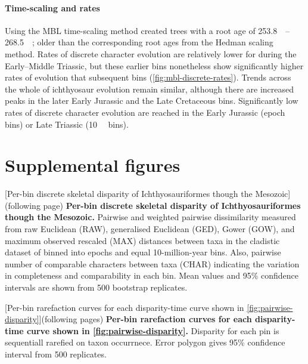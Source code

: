 \documentclass[british,a4paper]{article}
\makeatletter
\renewcommand\listoffigures{%
	    \@starttoc{lof}%
    }
\newcommand\pcref[1]{(\cref{#1})}
\makeatother
\begin{document}
\paragraph{Time-scaling and rates}\label{par:mbl-scaling-rates}

Using the MBL time-scaling method created trees with a root age of
\SIrange{253.8}{268.5}{\mega\annum}; older than the corresponding root ages from
the Hedman scaling method. Rates of discrete character evolution are relatively
lower for during the Early–Middle Triassic, but these earlier bins nonetheless
show significantly higher rates of evolution that subsequent bins
\pcref{fig:mbl-discrete-rates}. Trends across the whole of ichthyosaur evolution
remain similar, although there are increased peaks in the later Early Jurassic
and the Late Cretaceous bins. Significantly low rates of discrete character
evolution are reached in the Early Jurassic (epoch bins) or Late Triassic
(\SI{10}{\mega\annum} bins).



\section{Supplemental figures}\label{sec:supplemental-figures}

\listoffigures

[Per-bin discrete skeletal disparity of Ichthyosauriformes though
    the Mesozoic]{(following page) \textbf{Per-bin discrete skeletal disparity
    of Ichthyosauriformes though the Mesozoic.} Pairwise and weighted
    pairwise dissimilarity measured from raw Euclidean (RAW), generalised
    Euclidean (GED), Gower (GOW), and maximum observed rescaled (MAX)
    distances between taxa in the cladistic dataset of \textcite{Moon2018JSP}
    binned into epochs and equal 10-million-year bins. Also, pairwise number
    of comparable characters between taxa (CHAR) indicating the variation in
    completeness and comparability in each bin. Mean values and 95\%
    confidence intervals are shown from 500 bootstrap
    replicates.\label{fig:pairwise-disparity}}


[Per-bin rarefaction curves for each disparity-time curve
    shown in \cref{fig:pairwise-disparity}]{(following pages) \textbf{Per-bin
    rarefaction curves for each disparity-time curve shown in
    \cref{fig:pairwise-disparity}.} Disparity for each pin is sequentiall
    rarefied on taxon occurrnece. Error polygon gives 95\% confidence interval
    from 500 replicates.\label{fig:pd-rarefaction-curves}}

\end{document}

